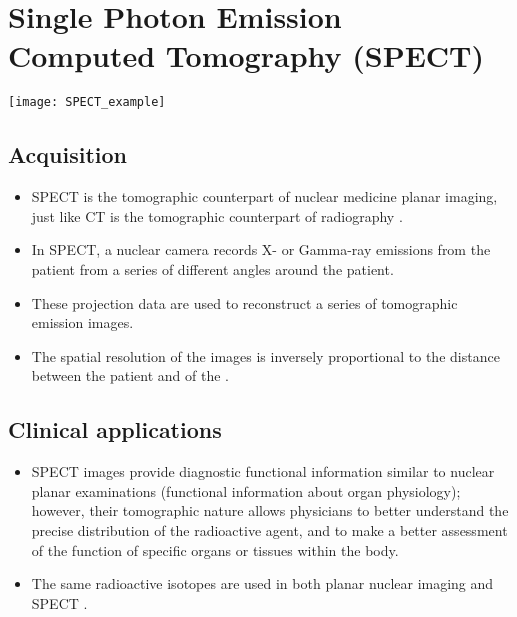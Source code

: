 \chapter[\glsentrylong{SPECT} (\glsentryshort{SPECT})]{Single Photon Emission\\Computed Tomography (SPECT)}
\vspace{-45ex}
\begin{flushright}
\texttt{[image: SPECT\_example]} %
\end{flushright}

\section{Acquisition}
\begin{itemize}
\item \gls{SPECT} is the tomographic counterpart of nuclear medicine
  planar imaging, just like CT is the tomographic counterpart of
  radiography \cite{bushberg2011essential,wikipedia_SPECT}.
  
\item In SPECT, a nuclear camera records X- or Gamma-ray emissions
  from the patient from a series of different angles around the
  patient.
  
\item  These projection data are used to reconstruct a series of
  tomographic emission images.

\item The spatial resolution of the images is inversely proportional
  to the distance between the patient and of the .
\end{itemize}

\section{Clinical applications}
\begin{itemize}
\item SPECT images provide diagnostic functional information similar
  to nuclear planar examinations (functional information about organ
  physiology); however, their tomographic nature allows physicians to
  better understand the precise distribution of the radioactive agent,
  and to make a better assessment of the function of specific organs
  or tissues within the body.
\item The same radioactive isotopes are used in both planar nuclear
  imaging and SPECT \cite{bushberg2011essential}.
\end{itemize}


